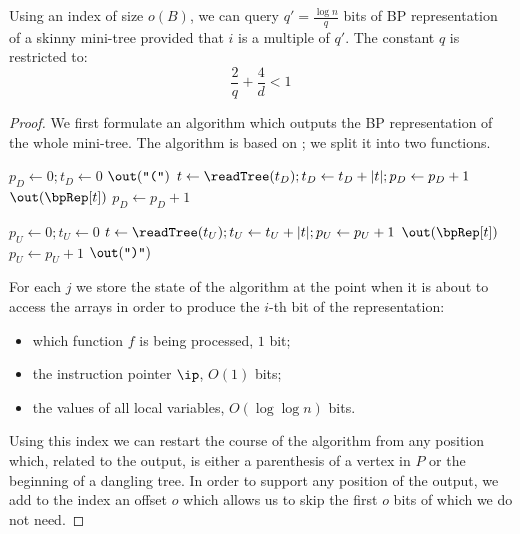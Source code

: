 \begin{lemma}\label{l:usr-bp-skinny}
	Using an index of size $o(B)$, we can query $q' = \frac{\log n}{q}$ bits of BP representation of a skinny mini-tree provided that $i$ is a multiple of $q'$.
	The constant $q$ is restricted to:
	$$\frac{2}{q} + \frac{4}{d} < 1$$
\end{lemma}
\begin{proof}
	We first formulate an algorithm which outputs the BP representation of the whole mini-tree.
	The algorithm is based on \restore{}; we split it into two functions.
	
	\begin{algorithm}
	\begin{algorithmic}
	\Function{\bpSkinnyDown}{}
		\State $p_D \gets 0; t_D \gets 0$
			\State $\out(\openingParen)$
				\State $t \gets \readTree(t_D); t_D \gets t_D + |t|; p_D \gets p_D + 1$
				\State $\out(\bpRep[t])$
			\EndWhile
			\State $p_D \gets p_D + 1$ 
		\EndWhile
	\EndFunction

	\Function{\bpSkinnyUp}{}
		\State $p_U \gets 0; t_U \gets 0$
				\State $t \gets \readTree(t_U); t_U \gets t_U + |t|; p_U \gets p_U + 1$
				\State $\out(\bpRep[t])$
			\EndWhile
			\State $p_U \gets p_U + 1$ 
			\State $\out(\closingParen)$
		\EndWhile
	\EndFunction
	\end{algorithmic}
	\end{algorithm}
	
	For each $j$ we store the state of the algorithm at the point when it is about to access the arrays in order to produce the $i$-th bit of the representation:
	\begin{itemize}
		\item which function $f$ is being processed, $1$ bit;
		\item the instruction pointer $\ip$, $O(1)$ bits;
		\item the values of all local variables, $O(\log \log n)$ bits.
	\end{itemize}
	
	Using this index we can restart the course of the algorithm from any position which, related to the output, is either a parenthesis of a vertex in $P$ or the beginning of a dangling tree.
	In order to support any position of the output, we add to the index an offset $o$ which allows us to skip the first $o$ bits of which we do not need.
	

\end{proof}
